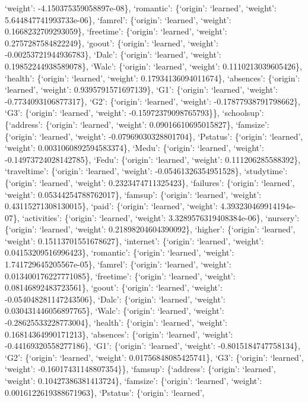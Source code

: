 \documentclass[
]{article}
\begin{document}
`weight': -4.150375359058897e-08\}, `romantic': \{`origin': `learned',
`weight': 5.644847741993733e-06\}, `famrel': \{`origin': `learned',
`weight': 0.1668232709293059\}, `freetime': \{`origin': `learned',
`weight': 0.2757287584822249\}, `goout': \{`origin': `learned',
`weight': -0.00253721944936783\}, `Dalc': \{`origin': `learned',
`weight': 0.19852244938589078\}, `Walc': \{`origin': `learned',
`weight': 0.1110213039605426\}, `health': \{`origin': `learned',
`weight': 0.17934136094011674\}, `absences': \{`origin': `learned',
`weight': 0.9395791571697139\}, `G1': \{`origin': `learned', `weight':
-0.7734093106877317\}, `G2': \{`origin': `learned', `weight':
-0.17877938791798662\}, `G3': \{`origin': `learned', `weight':
-0.15972379098765793\}\}, `schoolsup': \{`address': \{`origin':
`learned', `weight': 0.09016610695015827\}, `famsize': \{`origin':
`learned', `weight': -0.07969030328801704\}, `Pstatus': \{`origin':
`learned', `weight': 0.0031060892594583374\}, `Medu': \{`origin':
`learned', `weight': -0.14973724028142785\}, `Fedu': \{`origin':
`learned', `weight': 0.111206285588392\}, `traveltime': \{`origin':
`learned', `weight': -0.05461326354951528\}, `studytime': \{`origin':
`learned', `weight': 0.2323474711325423\}, `failures': \{`origin':
`learned', `weight': 0.05344254788762017\}, `famsup': \{`origin':
`learned', `weight': 0.43115271308130015\}, `paid': \{`origin':
`learned', `weight': 4.393230469914194e-07\}, `activities': \{`origin':
`learned', `weight': 3.3289576319408384e-06\}, `nursery': \{`origin':
`learned', `weight': 0.21898204604390092\}, `higher': \{`origin':
`learned', `weight': 0.15113701551678627\}, `internet': \{`origin':
`learned', `weight': 0.04153209516996423\}, `romantic': \{`origin':
`learned', `weight': 1.741729645205567e-05\}, `famrel': \{`origin':
`learned', `weight': 0.013400176227771085\}, `freetime': \{`origin':
`learned', `weight': 0.08146892483723561\}, `goout': \{`origin':
`learned', `weight': -0.054048281147243506\}, `Dalc': \{`origin':
`learned', `weight': 0.030431446056897765\}, `Walc': \{`origin':
`learned', `weight': -0.28625533228773004\}, `health': \{`origin':
`learned', `weight': 0.16814364990171213\}, `absences': \{`origin':
`learned', `weight': -0.44169320558277186\}, `G1': \{`origin':
`learned', `weight': -0.8015184747758134\}, `G2': \{`origin': `learned',
`weight': 0.01756848085425741\}, `G3': \{`origin': `learned', `weight':
-0.16017431148807354\}\}, `famsup': \{`address': \{`origin': `learned',
`weight': 0.10427386381413724\}, `famsize': \{`origin': `learned',
`weight': 0.0016122619388671963\}, `Pstatus': \{`origin': `learned',
\end{document}
